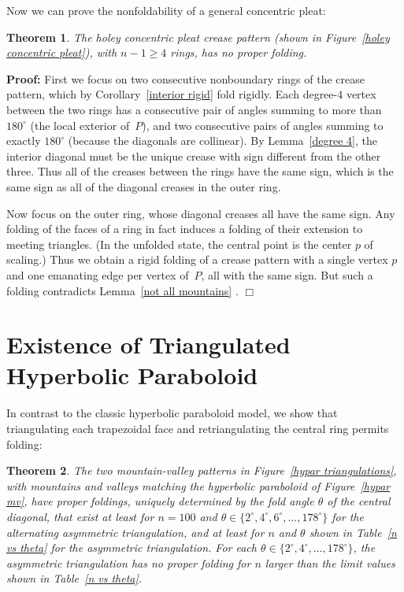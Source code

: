 \documentclass[11pt,letterpaper]{article}
\newtheorem{theorem}{Theorem}
\newenvironment{proof}{\noindent\textbf{Proof: }\ignorespaces}
  {\hspace*{\fill}$\Box$\medskip}
\begin{document}
Now we can prove the nonfoldability of a general concentric pleat:

\begin{theorem}
  The holey concentric pleat crease pattern
  (shown in Figure~\ref{holey concentric pleat}), with $n-1 \geq 4$ rings,
  has no proper folding.
\end{theorem}

\begin{proof}
  First we focus on two consecutive nonboundary rings of the crease pattern,
  which by Corollary~\ref{interior rigid} fold rigidly.
  Each degree-$4$ vertex between the two rings
  has a consecutive pair of angles summing to more than $180^\circ$
  (the local exterior of~$P$), and two consecutive pairs of angles summing to
  exactly $180^\circ$ (because the diagonals are collinear).
  By Lemma~\ref{degree 4}, the interior diagonal must be the unique crease
  with sign different from the other three.
  Thus all of the creases between the rings have the same sign,
  which is the same sign as all of the diagonal creases in the outer ring.

  Now focus on the outer ring, whose diagonal creases all have the same sign.
  Any folding of the faces of a ring in fact induces a folding of their
  extension to meeting triangles.
  (In the unfolded state, the central point is the center $p$ of scaling.)
  Thus we obtain a rigid folding of a crease pattern with a single vertex $p$
  and one emanating edge per vertex of~$P$, all with the same sign.
  But such a folding contradicts Lemma~\ref{not all mountains} .
\end{proof}



\section{Existence of Triangulated Hyperbolic Paraboloid}

In contrast to the classic hyperbolic paraboloid model,
we show that triangulating each trapezoidal face
and retriangulating the central ring permits folding:

\begin{theorem}
  The two mountain-valley patterns in Figure~\ref{hypar triangulations},
  with mountains and valleys matching the hyperbolic paraboloid
  of Figure~\ref{hypar mv}, have proper foldings,
  uniquely determined by the fold angle $\theta$ of the central diagonal,
  that exist at least for $n = 100$ and
  $\theta \in \{2^\circ,4^\circ,6^\circ,\dots,178^\circ\}$
  for the alternating asymmetric triangulation,
  and at least for $n$ and $\theta$ shown in Table~\ref{n vs theta}
  for the asymmetric triangulation.
  For each $\theta \in \{2^\circ,4^\circ,\dots,178^\circ\}$,
  the asymmetric triangulation has no proper folding for $n$ larger
  than the limit values shown in Table~\ref{n vs theta}.
\end{theorem}
\end{document}
